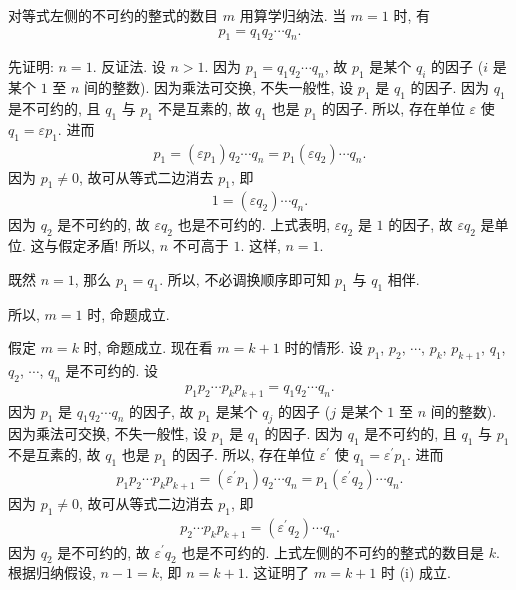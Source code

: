 \begin{pf}
    对等式左侧的不可约的整式的数目 $m$ 用算学归纳法. 当 $m = 1$ 时, 有
    \begin{align*}
        p_1 = q_1 q_2 \cdots q_n.
    \end{align*}

    先证明: $n = 1$. 反证法. 设 $n > 1$. 因为 $p_1 = q_1 q_2 \cdots q_n$, 故 $p_1$ 是某个 $q_i$ 的因子 ($i$ 是某个 $1$ 至 $n$ 间的整数). 因为乘法可交换, 不失一般性, 设 $p_1$ 是 $q_1$ 的因子. 因为 $q_1$ 是不可约的, 且 $q_1$ 与 $p_1$ 不是互素的, 故 $q_1$ 也是 $p_1$ 的因子. 所以, 存在单位 $\varepsilon$ 使 $q_1 = \varepsilon p_1$. 进而
    \begin{align*}
        p_1 = (\varepsilon p_1) q_2 \cdots q_n = p_1 (\varepsilon q_2) \cdots q_n.
    \end{align*}
    因为 $p_1 \neq 0$, 故可从等式二边消去 $p_1$, 即
    \begin{align*}
        1 = (\varepsilon q_2) \cdots q_n.
    \end{align*}
    因为 $q_2$ 是不可约的, 故 $\varepsilon q_2$ 也是不可约的. 上式表明, $\varepsilon q_2$ 是 $1$ 的因子, 故 $\varepsilon q_2$ 是单位. 这与假定矛盾! 所以, $n$ 不可高于 $1$. 这样, $n = 1$.

    既然 $n = 1$, 那么 $p_1 = q_1$. 所以, 不必调换顺序即可知 $p_1$ 与 $q_1$ 相伴.

    所以, $m=1$ 时, 命题成立.

    假定 $m=k$ 时, 命题成立. 现在看 $m=k+1$ 时的情形. 设 $p_1$, $p_2$, $\cdots$, $p_k$, $p_{k+1}$, $q_1$, $q_2$, $\cdots$, $q_n$ 是不可约的. 设
    \begin{align*}
        p_1 p_2 \cdots p_k p_{k+1} = q_1 q_2 \cdots q_n.
    \end{align*}
    因为 $p_1$ 是 $q_1 q_2 \cdots q_n$ 的因子, 故 $p_1$ 是某个 $q_j$ 的因子 ($j$ 是某个 $1$ 至 $n$ 间的整数). 因为乘法可交换, 不失一般性, 设 $p_1$ 是 $q_1$ 的因子. 因为 $q_1$ 是不可约的, 且 $q_1$ 与 $p_1$ 不是互素的, 故 $q_1$ 也是 $p_1$ 的因子. 所以, 存在单位 $\varepsilon^{\prime}$ 使 $q_1 = \varepsilon^{\prime} p_1$. 进而
    \begin{align*}
        p_1 p_2 \cdots p_k p_{k+1} = (\varepsilon^{\prime} p_1) q_2 \cdots q_n = p_1 (\varepsilon^{\prime} q_2) \cdots q_n.
    \end{align*}
    因为 $p_1 \neq 0$, 故可从等式二边消去 $p_1$, 即
    \begin{align*}
        p_2 \cdots p_k p_{k+1} = (\varepsilon^{\prime} q_2) \cdots q_n.
    \end{align*}
    因为 $q_2$ 是不可约的, 故 $\varepsilon^{\prime} q_2$ 也是不可约的. 上式左侧的不可约的整式的数目是 $k$. 根据归纳假设, $n-1 = k$, 即 $n = k+1$. 这证明了 $m=k+1$ 时 (i) 成立.


\end{pf}
